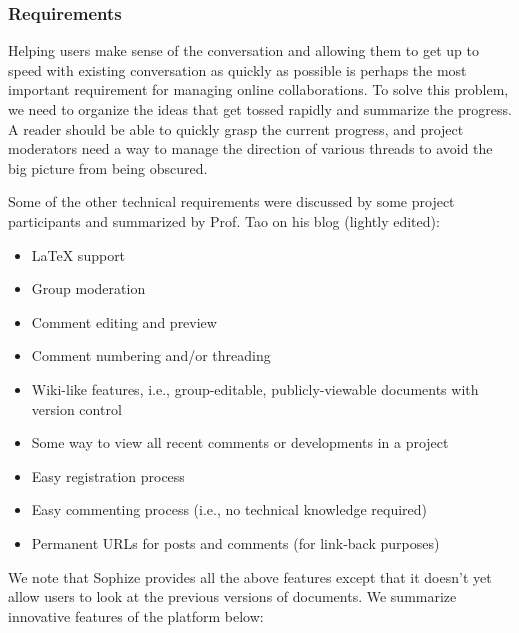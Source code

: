 \documentclass[a4paper]{article}
\begin{document}
\subsubsection*{Requirements}

Helping users make sense of the conversation and allowing them to get up to speed with existing conversation as quickly as possible is perhaps the most important requirement for managing online collaborations. To solve this problem, we need to organize the ideas that get tossed rapidly and summarize the progress. A reader should be able to quickly grasp the current progress, and project moderators need a way to manage the direction of various threads to avoid the big picture from being obscured.


Some of the other technical requirements were discussed by some project participants and summarized by Prof. Tao on his blog\cite{whats_new_2009} (lightly edited):

\begin{itemize}

  \item LaTeX support

  \item Group moderation

  \item Comment editing and preview

  \item Comment numbering and/or threading

  \item Wiki-like features, i.e., group-editable, publicly-viewable documents with version control

  \item Some way to view all recent comments or developments in a project

  \item Easy registration process

  \item Easy commenting process (i.e., no technical knowledge required)

  \item Permanent URLs for posts and comments (for link-back purposes)

\end{itemize}


We note that Sophize provides all the above features except that it doesn't yet allow users to look at the previous versions of documents. We summarize innovative features of the platform below:
\end{document}
